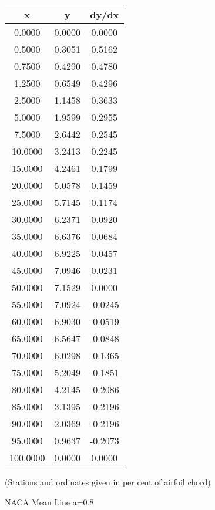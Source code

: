 \documentclass[11pt]{book}
\begin{document}
 \vspace{8mm}
 \begin{tabular}{|c|c|c|}  \hline
 x & y & dy/dx \\
 \hline
0.0000 & 0.0000 & 0.0000 \\
0.5000 & 0.3051 & 0.5162 \\
0.7500 & 0.4290 & 0.4780 \\
1.2500 & 0.6549 & 0.4296 \\
2.5000 & 1.1458 & 0.3633 \\
5.0000 & 1.9599 & 0.2955 \\
7.5000 & 2.6442 & 0.2545 \\
10.0000 & 3.2413 & 0.2245 \\
15.0000 & 4.2461 & 0.1799 \\
20.0000 & 5.0578 & 0.1459 \\
25.0000 & 5.7145 & 0.1174 \\
30.0000 & 6.2371 & 0.0920 \\
35.0000 & 6.6376 & 0.0684 \\
40.0000 & 6.9225 & 0.0457 \\
45.0000 & 7.0946 & 0.0231 \\
50.0000 & 7.1529 & 0.0000 \\
55.0000 & 7.0924 & -0.0245 \\
60.0000 & 6.9030 & -0.0519 \\
65.0000 & 6.5647 & -0.0848 \\
70.0000 & 6.0298 & -0.1365 \\
75.0000 & 5.2049 & -0.1851 \\
80.0000 & 4.2145 & -0.2086 \\
85.0000 & 3.1395 & -0.2196 \\
90.0000 & 2.0369 & -0.2196 \\
95.0000 & 0.9637 & -0.2073 \\
100.0000 & 0.0000 & 0.0000 \\
 \hline
 \end{tabular}
 \vspace{8mm}

(Stations and ordinates given in per cent of airfoil chord)

 \newpage
 \label{mla=0.8}
 \begin{Large}
 NACA Mean Line a=0.8
 \end{Large}
  
\end{document}

